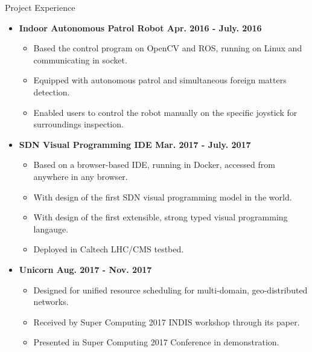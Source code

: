 \documentclass[10pt,oneside]{article}
\newenvironment{ressection}[1]{
	\vspace{4pt}
	{\fontfamily{phv}\selectfont\Large#1}
	\begin{itemize}
	\vspace{3pt}
}{
	\end{itemize}
}
\newcommand{\resitem}[1]{
	\vspace{-4pt}
	\item \begin{flushleft} #1 \end{flushleft}
}
\newcommand{\ressubitem}[1]{
	\vspace{-1pt}
	\item \begin{flushleft} #1 \end{flushleft}
}
\newenvironment{reslist}[1]{
	\resitem{\textbf{#1}}
	\vspace{-5pt}
	\begin{itemize}
}{
	\end{itemize}
}
\begin{document}
\begin{ressection}{Project Experience}
	\begin{reslist}{Indoor Autonomous Patrol Robot \hfill Apr. 2016 - July. 2016}
		\ressubitem{Based the control program on OpenCV and ROS, running on Linux and communicating in socket.}
		\ressubitem{Equipped with autonomous patrol and simultaneous foreign matters detection.}
		\ressubitem{Enabled users to control the robot manually on the specific joystick for surroundings inspection.}
	\end{reslist}
	\begin{reslist}{SDN Visual Programming IDE \hfill Mar. 2017 - July. 2017}
		\ressubitem{Based on a browser-based IDE, running in Docker, accessed from anywhere in any browser.}
		\ressubitem{With design of the first SDN visual programming model in the world.}
		\ressubitem{With design of the first extensible, strong typed visual programming langauge.}
		\ressubitem{Deployed in Caltech LHC/CMS testbed.}
	\end{reslist}
	\begin{reslist}{Unicorn \hfill Aug. 2017 - Nov. 2017}
		\ressubitem{Designed for unified resource scheduling for multi-domain, geo-distributed networks.}
		\ressubitem{Received by Super Computing 2017 INDIS workshop through its paper.}
		\ressubitem{Presented in Super Computing 2017 Conference in demonstration.}
	\end{reslist}
\end{ressection}
\end{document}
